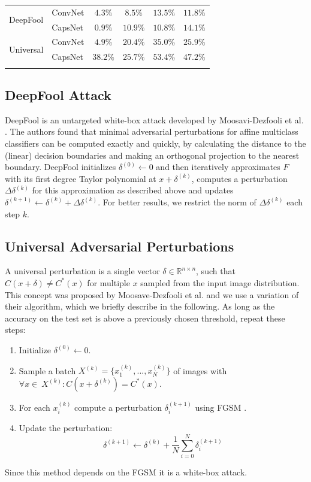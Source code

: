\documentclass{article}
\begin{document}
\begin{table}[h]
\begin{minipage}{.45\linewidth}
{\begin{tabular}{llcccc}
				\midrule
				\multirow{2}{*}{DeepFool} & ConvNet & $4.3\%$ & $8.5\%$ & $13.5\%$ & $11.8\%$ \\
				& CapsNet           & $0.9\%$ & $10.9\%$ & $10.8\%$ & $14.1\%$ \\
				\midrule
				\multirow{2}{*}{Universal} & ConvNet & $4.9\%$ & $20.4\%$ & $35.0\%$ & $25.9\%$ \\
				& CapsNet           & $38.2\%$ & $25.7\%$ & $53.4\%$ & $47.2\%$ \\
				\bottomrule\\
		\end{tabular}}
		\label{tab:attacks}\end{minipage}
\end{table}


\subsection{DeepFool Attack}
DeepFool is an untargeted white-box attack developed by
Moosavi-Dezfooli et al. .  The authors found that
minimal adversarial perturbations for affine multiclass classifiers can
be computed exactly and quickly, by calculating the distance to the
(linear) decision boundaries and making an orthogonal projection to
the nearest boundary.  DeepFool initializes $\delta^{(0)} \gets 0$ and then
iteratively approximates $F$ with its first degree Taylor polynomial
at $x + \delta^{(k)}$, computes a perturbation $\Delta \delta^{(k)}$
for this approximation as described above and updates
$\delta^{(k+1)} \gets \delta^{(k)} + \Delta \delta^{(k)} $.  For
better results, we restrict the norm of $\Delta \delta^{(k)} $ each
step $k$.

\subsection{Universal Adversarial Perturbations}
\label{sec:universal}
A universal perturbation is a single vector $\delta \in \mathbb{R}^{n\times n}$, such that $C(x + \delta) \neq C^*(x)$ for multiple $x$ sampled from the input image distribution. This concept was proposed by Moosave-Dezfooli et al.  and we use a variation of their algorithm, which we briefly describe in the following. As long as the accuracy on the test set is above a previously chosen threshold, repeat these steps:
\begin{enumerate}
	\item Initialize $\delta^{(0)} \gets 0$.
	\item Sample a batch $X^{(k)} = \{x_1^{(k)}, ..., x_N^{(k)}\}$ of images with $\forall x \in\ X^{(k)}:  C(x + \delta^{(k)}) = C^*(x)$.
	\item For each $x_i^{(k)}$ compute a perturbation $\delta_i^{(k+1)}$ using FGSM \cite{fgsm}.
	\item Update the perturbation: $$\delta^{(k+1)} \gets \delta^{(k)} + \frac{1}{N} \sum\limits_{i=0}^N \delta_i^{(k+1)}$$
\end{enumerate}
Since this method depends on the FGSM it is a white-box attack.
\end{document}
